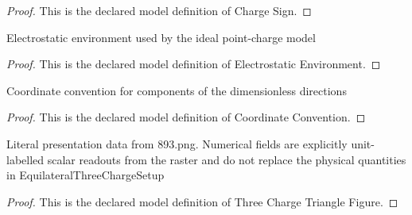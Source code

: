 \begin{proof}
  This is the declared model definition of Charge Sign.
\end{proof}
\begin{definition}
  \label{def:physics:phyx-mini-0893:phyxminiproblems-problemphyxmini0893-electrostaticenvironment}
  Electrostatic environment used by the ideal point-charge model
\end{definition}
\begin{proof}
  This is the declared model definition of Electrostatic Environment.
\end{proof}
\begin{definition}
  \label{def:physics:phyx-mini-0893:phyxminiproblems-problemphyxmini0893-coordinateconvention}
  Coordinate convention for components of the dimensionless directions
\end{definition}
\begin{proof}
  This is the declared model definition of Coordinate Convention.
\end{proof}
\begin{definition}
  \label{def:physics:phyx-mini-0893:phyxminiproblems-problemphyxmini0893-threechargetrianglefigure}
  Literal presentation data from 893.png. Numerical fields are explicitly unit-labelled scalar readouts from the raster and do not replace the physical quantities in EquilateralThreeChargeSetup
\end{definition}
\begin{proof}
  This is the declared model definition of Three Charge Triangle Figure.
\end{proof}
